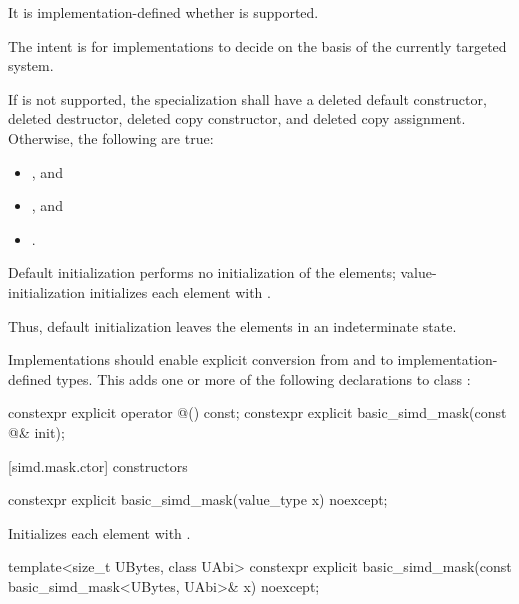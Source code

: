 It is implementation-defined whether  is supported.
\begin{note}The intent is for implementations to decide on the basis of the currently targeted system.\end{note}

If  is not supported, the specialization shall have a deleted default constructor, deleted destructor, deleted copy constructor, and deleted copy assignment.
Otherwise, the following are true:
\begin{itemize}
  \item {}, and
  \item {}, and
  \item {}.
\end{itemize}

\pnum
Default initialization performs no initialization of the elements; value-initialization initializes each element with . \begin{note}Thus, default initialization leaves the elements in an indeterminate state.\end{note}

\pnum
Implementations should enable explicit conversion from and to implementation-defined types. This adds one or more of the following declarations to class :

\begin{codeblock}
constexpr explicit operator @\impdef@() const;
constexpr explicit basic_simd_mask(const @\impdef@& init);
\end{codeblock}

[simd.mask.ctor]{ constructors}

\begin{itemdecl}
constexpr explicit basic_simd_mask(value_type x) noexcept;
\end{itemdecl}

\begin{itemdescr}
  \pnum\effects
  Initializes each element with .
\end{itemdescr}

\begin{itemdecl}
template<size_t UBytes, class UAbi>
  constexpr explicit basic_simd_mask(const basic_simd_mask<UBytes, UAbi>& x) noexcept;
\end{itemdecl}

